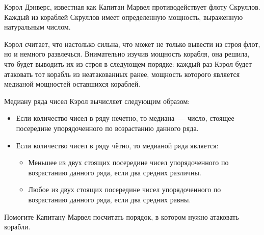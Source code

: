 Кэрол Дэнверс, известная как Капитан Марвел противодействует флоту Скруллов. Каждый из кораблей Скруллов имеет
определенную мощность, выраженную натуральным числом.

Кэрол считает, что настолько сильна, что может не только вывести из строя флот, но и немного развлечься. Внимательно изучив мощность корабля, она решила, что будет выводить их из строя в следующем порядке: каждый раз Кэрол будет атаковать тот 
корабль из неатакованных ранее, мощность которого является медианой мощностей оставшихся кораблей.

Медиану ряда чисел Кэрол вычисляет следующим образом:
\begin{itemize}
  \item Если количество чисел в ряду нечетно, то медиана~--- число, стоящее посередине   упорядоченного по возрастанию данного ряда. 
  \item Если количество чисел в ряду чётно, то медианой ряда является:
  \begin{itemize}
  \item Меньшее из двух стоящих посередине чисел упорядоченного по возрастанию данного ряда, если два средних различны.
  \item Любое из двух стоящих посередине чисел упорядоченного по возрастанию данного ряда, если два средних равны.
  \end{itemize}
\end{itemize}

Помогите Капитану Марвел посчитать порядок, в котором нужно атаковать корабли.

